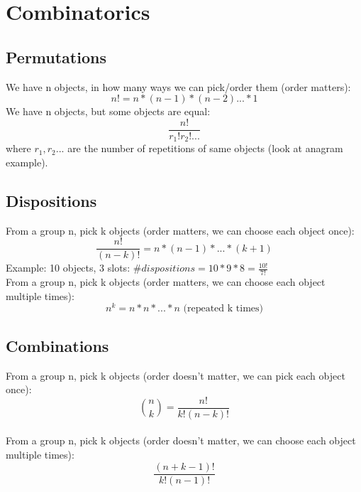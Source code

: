 \chapter{Combinatorics}
\section{Permutations}
We have n objects, in how many ways we can pick/order them (order matters):
\begin{equation*}
    n!=n*(n-1)*(n-2)...*1
\end{equation*}
\medskip
We have n objects, but some objects are equal:
\begin{equation*}
    \frac{n!}{r_1!r_2!...}
\end{equation*}
where $r_1, r_2...$ are the number of repetitions of same objects (look at anagram example).
\section{Dispositions}
From a group n, pick k objects (order matters, we can choose each object once):
\begin{equation*}
    \frac{n!}{(n-k)!}=n*(n-1)*...*(k+1)
\end{equation*}
Example: 10 objects, 3 slots: $\#dispositions = 10*9*8 = \frac{10!}{7!}$\\
\medskip
From a group n, pick k objects (order matters, we can choose each object multiple times):
\begin{equation*}
    n^k = n*n*...*n \text{ (repeated k times)}
\end{equation*}
\section{Combinations}
From a group n, pick k objects (order doesn't matter, we can pick each object once):
\begin{equation*}
    \binom{n}{k} = \frac{n!}{k!(n-k)!}
\end{equation*}\\
\medskip
From a group n, pick k objects (order doesn't matter, we can choose each object multiple times):
\begin{equation*}
    \frac{(n+k-1)!}{k!(n-1)!}
\end{equation*}
